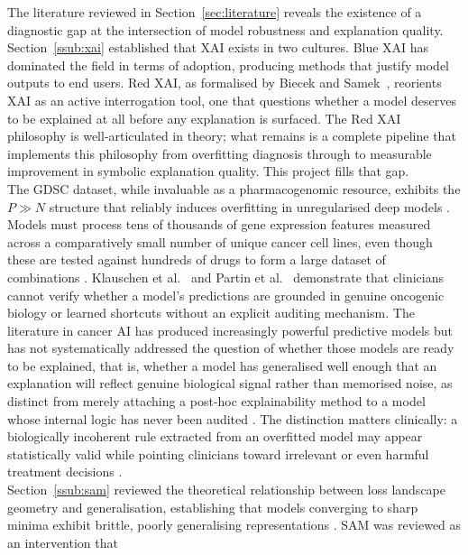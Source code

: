\label{ssub:critical-analysis}

The literature reviewed in Section~\ref{sec:literature} reveals the existence of a diagnostic gap at
the intersection of model robustness and explanation quality.
\\
Section~\ref{ssub:xai} established that XAI exists in two cultures. Blue XAI has dominated the field in
terms of adoption, producing methods that justify model outputs to end users. Red XAI, as formalised
by Biecek and Samek~\cite{Biecek2024}, reorients XAI as an active interrogation tool, one that
questions whether a model deserves to be explained at all before any explanation is surfaced. The Red
XAI philosophy is well-articulated in theory; what remains is a complete pipeline that implements this
philosophy from overfitting diagnosis through to measurable improvement in symbolic explanation
quality. This project fills that gap.
\\
The GDSC dataset, while invaluable as a pharmacogenomic resource, exhibits the $P \gg N$ structure
that reliably induces overfitting in unregularised deep models \cite{Partin2023}. Models must process
tens of thousands of gene expression features measured across a comparatively small number of unique
cancer cell lines, even though these are tested against hundreds of drugs to form a large dataset of
combinations \cite{Wu2025}. Klauschen et al.~\cite{Klauschen2024} and Partin et al.~\cite{Partin2023}
demonstrate that clinicians cannot verify whether a model's predictions are grounded in genuine
oncogenic biology or learned shortcuts without an explicit auditing mechanism. The literature in
cancer AI has produced increasingly powerful predictive models but has not systematically addressed
the question of whether those models are ready to be explained, that is, whether a model has
generalised well enough that an explanation will reflect genuine biological signal rather than
memorised noise, as distinct from merely attaching a post-hoc explainability method to a model whose
internal logic has never been audited \cite{Wicker2023,Ye2024}. The
distinction matters clinically: a biologically incoherent rule extracted from an overfitted model may
appear statistically valid while pointing clinicians toward irrelevant or even harmful treatment
decisions \cite{Pahde2023,Klauschen2024}.
\\
Section~\ref{ssub:sam} reviewed the theoretical relationship between loss landscape geometry and
generalisation, establishing that models converging to sharp minima exhibit brittle, poorly
generalising representations \cite{Li2018,Keskar2016}. SAM was reviewed as an intervention that
